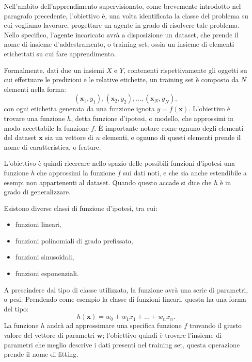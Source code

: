 \documentclass[../../main.tex]{subfiles}
\begin{document}
    Nell'ambito dell'apprendimento supervisionato, come brevemente introdotto nel paragrafo precedente, l'obiettivo è, una volta identificata la classe del problema su cui vogliamo lavorare, progettare un agente in grado di risolvere tale problema. Nello specifico, l'agente incaricato avrà a disposizione un dataset, che prende il nome di insieme d'addestramento, o training set, ossia un insieme di elementi etichettati su cui fare apprendimento.

    Formalmente, dati due un insiemi $X$ e $Y$, contenenti rispettivamente gli oggetti su cui effettuare le predizioni e le relative etichette, un training set è composto da $N$ elementi nella forma:
    \[(\boldsymbol{x}_1, y_1), (\boldsymbol{x}_2, y_2), \dots, (\boldsymbol{x}_N, y_N),\]
    con ogni etichetta generata da una funzione ignota $y = f(\boldsymbol{x})$. L'obiettivo è trovare una funzione $h$, detta funzione d'ipotesi, o modello, che approssimi in modo accettabile la funzione $f$. È importante notare come ognuno degli elementi del dataset $\boldsymbol{x}$ sia un vettore di $n$ elementi, e ognuno di questi elementi prende il nome di caratteristica, o feature.

    L'obiettivo è quindi ricercare nello spazio delle possibili funzioni d'ipotesi una funzione $h$ che approssimi la funzione $f$ sui dati noti, e che sia anche estendibile a esempi non appartenenti al dataset. Quando questo accade si dice che $h$ è in grado di generalizzare.

    Esistono diverse classi di funzione d'ipotesi, tra cui:
    \begin{itemize}
        \item funzioni lineari,
        \item funzioni polinomiali di grado prefissato,
        \item funzioni sinusoidali,
        \item funzioni esponenziali.
    \end{itemize}

    A prescindere dal tipo di classe utilizzata, la funzione avrà una serie di parametri, o pesi. Prendendo come esempio la classe di funzioni lineari, questa ha una forma del tipo:
    \[ h(\boldsymbol{x}) = w_0 + w_1x_1 + \dots + w_nx_n .\]
    La funzione $h$ andrà ad approssimare una specifica funzione $f$ trovando il giusto valore del vettore di parametri $\boldsymbol{w}$; l'obiettivo quindi è trovare l'insieme di parametri che meglio descrive i dati presenti nel training set, questa operazione prende il nome di fitting. 
\end{document}
